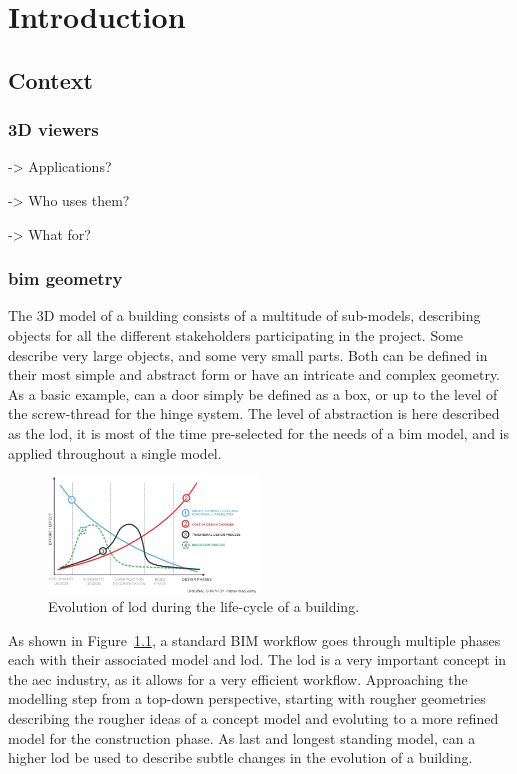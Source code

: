 \chapter{Introduction}
\section{Context}
\subsection{3D viewers}
-> Applications?

-> Who uses them?

-> What for?

\subsection{\acs{bim} geometry} \label{subsec:bimGeometry}

The 3D model of a building consists of a multitude of sub-models, describing objects for all the different stakeholders participating in the project. Some describe very large objects, and some very small parts. Both can be defined in their most simple and abstract form or have an intricate and complex geometry. As a basic example, can a door simply be defined as a box, or up to the level of the screw-thread for the hinge system. The level of abstraction is here described as the \ac{lod}, it is most of the time pre-selected for the needs of a \ac{bim} model, and is applied throughout a single model.

\begin{figure}[h]
    \centering
    \includegraphics[width=0.5\textwidth]{figures/BIM grafiek.png}
    \caption{Evolution of \acs{lod} during the life-cycle of a building.}
    \label{fig:bimGraph}
\end{figure}

As shown in Figure~\ref{fig:bimGraph}, a standard BIM workflow goes through multiple phases each with their associated model and \ac{lod}. The \ac{lod} is a very important concept in the \ac{aec} industry, as it allows for a very efficient workflow. Approaching the modelling step from a top-down perspective, starting with rougher geometries describing the rougher ideas of a concept model and evoluting to a more refined model for the construction phase. As last and longest standing model, can a higher \ac{lod} be used to describe subtle changes in the evolution of a building.

